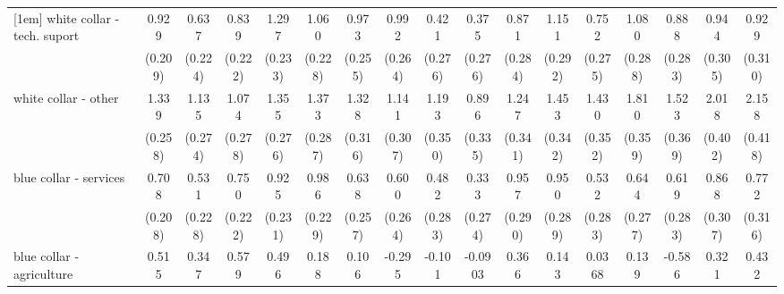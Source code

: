 {\begin{tabular}{l*{16}{c}}
[1em]
white collar - tech. suport&       0.929\sym{***}&       0.637\sym{**} &       0.839\sym{***}&       1.297\sym{***}&       1.060\sym{***}&       0.973\sym{***}&       0.992\sym{***}&       0.421         &       0.375         &       0.871\sym{**} &       1.151\sym{***}&       0.752\sym{**} &       1.080\sym{***}&       0.888\sym{**} &       0.944\sym{**} &       0.929\sym{**} \\
                    &     (0.209)         &     (0.224)         &     (0.222)         &     (0.233)         &     (0.228)         &     (0.255)         &     (0.264)         &     (0.276)         &     (0.276)         &     (0.284)         &     (0.292)         &     (0.275)         &     (0.288)         &     (0.283)         &     (0.305)         &     (0.310)         \\
[1em]
white collar - other&       1.339\sym{***}&       1.135\sym{***}&       1.074\sym{***}&       1.355\sym{***}&       1.373\sym{***}&       1.328\sym{***}&       1.141\sym{***}&       1.193\sym{***}&       0.896\sym{**} &       1.247\sym{***}&       1.453\sym{***}&       1.430\sym{***}&       1.810\sym{***}&       1.523\sym{***}&       2.018\sym{***}&       2.158\sym{***}\\
                    &     (0.258)         &     (0.274)         &     (0.278)         &     (0.276)         &     (0.287)         &     (0.316)         &     (0.307)         &     (0.350)         &     (0.335)         &     (0.341)         &     (0.342)         &     (0.352)         &     (0.359)         &     (0.369)         &     (0.402)         &     (0.418)         \\
[1em]
blue collar - services&       0.708\sym{***}&       0.531\sym{*}  &       0.750\sym{***}&       0.925\sym{***}&       0.986\sym{***}&       0.638\sym{*}  &       0.600\sym{*}  &       0.482         &       0.333         &       0.957\sym{***}&       0.950\sym{**} &       0.532         &       0.644\sym{*}  &       0.619\sym{*}  &       0.868\sym{**} &       0.772\sym{*}  \\
                    &     (0.208)         &     (0.228)         &     (0.222)         &     (0.231)         &     (0.229)         &     (0.257)         &     (0.264)         &     (0.283)         &     (0.274)         &     (0.290)         &     (0.289)         &     (0.283)         &     (0.277)         &     (0.283)         &     (0.307)         &     (0.316)         \\
[1em]
blue collar - agriculture&       0.515         &       0.347         &       0.579         &       0.496         &       0.188         &       0.106         &      -0.295         &      -0.101         &     -0.0903         &       0.366         &       0.143         &      0.0368         &       0.139         &      -0.586         &       0.321         &       0.432         \\

\end{tabular}}
